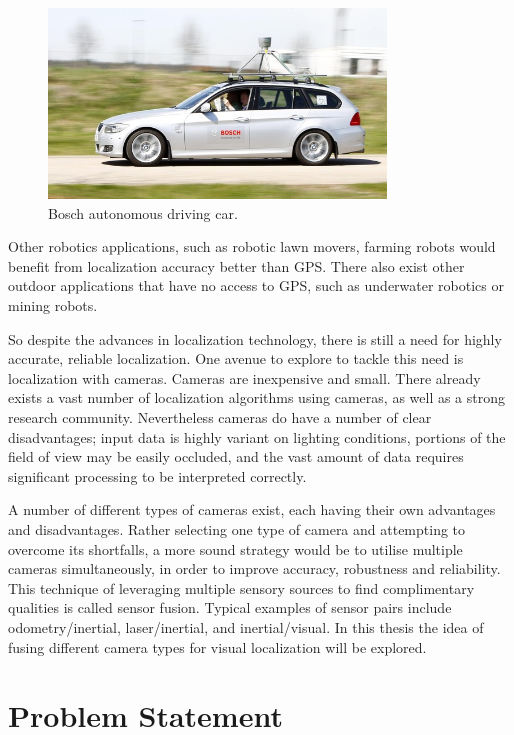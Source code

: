 \begin{figure}[h]
  \centering
    \includegraphics[width=0.8\textwidth]{chapters/images/bosch_car}
  \caption{Bosch autonomous driving car.}
  \label{fig:bosch_car}
\end{figure}

Other robotics applications, such as robotic lawn movers, farming robots would benefit from localization accuracy better than GPS.  There also exist other outdoor applications that have no access to GPS, such as underwater robotics or mining robots.

So despite the advances in localization technology, there is still a need for highly accurate, reliable localization.  One avenue to explore to tackle this need is localization with cameras.  Cameras are inexpensive and small.  There already exists a vast number of localization algorithms using cameras, as well as a strong research community.  Nevertheless cameras do have a number of clear disadvantages; input data is highly variant on lighting conditions, portions of the field of view may be easily occluded, and the vast amount of data requires significant processing to be interpreted correctly.

A number of different types of cameras exist, each having their own advantages and disadvantages.  Rather selecting one type of camera and attempting to overcome its shortfalls, a more sound strategy would be to utilise multiple cameras simultaneously, in order to improve accuracy, robustness and reliability.  This technique of leveraging multiple sensory sources to find complimentary qualities is called sensor fusion.  Typical examples of sensor pairs include odometry/inertial, laser/inertial, and inertial/visual.  In this thesis the idea of fusing different camera types for visual localization will be explored.

\section{Problem Statement}

